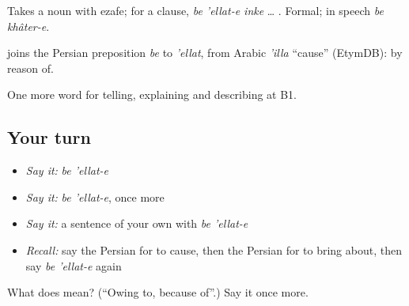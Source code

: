 Takes a noun with ezafe; for a clause, \emph{be 'ellat-e inke} … . Formal; in speech \emph{be khâter-e}.

\begin{cousinweb}
\textbf{ } joins the Persian preposition \emph{be} to \emph{'ellat}, from Arabic \emph{'illa} \textquotedblleft{}cause\textquotedblright{} (EtymDB): by reason of.
\end{cousinweb}

\begin{grammarlens}[title={What you've built}]
One more word for telling, explaining and describing at B1.
\end{grammarlens}

\subsection*{Your turn}
\begin{itemize}
\raggedright
  \item \emph{Say it:} \emph{be 'ellat-e}
  \item \emph{Say it:} \emph{be 'ellat-e}, once more
  \item \emph{Say it:} a sentence of your own with \emph{be 'ellat-e}
  \item \emph{Recall:} say the Persian for to cause, then the Persian for to bring about, then say \emph{be 'ellat-e} again
\end{itemize}

\begin{tcolorbox}[breakable,colback=teal!4,colframe=teal!35!black,title={Before you move on}]
What does   mean? (\textquotedblleft{}Owing to, because of\textquotedblright{}.) Say it once more.
\end{tcolorbox}
